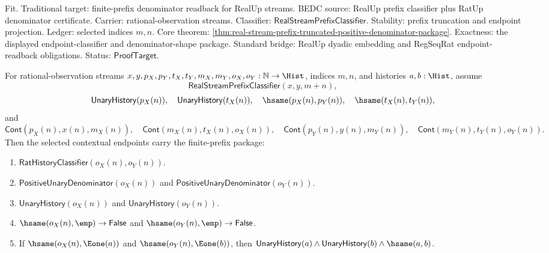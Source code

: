 Fit. Traditional target: finite-prefix denominator readback for RealUp streams.
BEDC source: RealUp prefix classifier plus RatUp denominator certificate.
Carrier: rational-observation streams. Classifier:
$\mathsf{RealStreamPrefixClassifier}$. Stability: prefix truncation and endpoint
projection. Ledger: selected indices $m,n$. Core theorem:
\autoref{thm:real-stream-prefix-truncated-positive-denominator-package}.
Exactness: the displayed endpoint-classifier and denominator-shape package.
Standard bridge: RealUp dyadic embedding and RegSeqRat endpoint-readback
obligations. Status: $\mathsf{ProofTarget}$.

\begin{theorem}
\label{thm:real-stream-prefix-contextual-e1-denominator-package}
For rational-observation streams
$x,y,p_X,p_Y,t_X,t_Y,m_X,m_Y,o_X,o_Y:\mathbb{N}\to\Hist$, indices $m,n$,
and histories $a,b:\Hist$, assume
$$
\mathsf{RealStreamPrefixClassifier}(x,y,m+n),
$$
$$
\mathsf{UnaryHistory}(p_X(n)),\quad
\mathsf{UnaryHistory}(t_X(n)),\quad
\hsame(p_X(n),p_Y(n)),\quad
\hsame(t_X(n),t_Y(n)),
$$
and
$$
\mathsf{Cont}(p_X(n),x(n),m_X(n)),\quad
\mathsf{Cont}(m_X(n),t_X(n),o_X(n)),
\quad
\mathsf{Cont}(p_Y(n),y(n),m_Y(n)),\quad
\mathsf{Cont}(m_Y(n),t_Y(n),o_Y(n)).
$$
Then the selected contextual endpoints carry the finite-prefix package:
\begin{enumerate}
\item $\mathsf{RatHistoryClassifier}(o_X(n),o_Y(n))$.
\item $\mathsf{PositiveUnaryDenominator}(o_X(n))$ and
$\mathsf{PositiveUnaryDenominator}(o_Y(n))$.
\item $\mathsf{UnaryHistory}(o_X(n))$ and $\mathsf{UnaryHistory}(o_Y(n))$.
\item $\hsame(o_X(n),\emp)\to\mathsf{False}$ and
$\hsame(o_Y(n),\emp)\to\mathsf{False}$.
\item If $\hsame(o_X(n),\Eone(a))$ and $\hsame(o_Y(n),\Eone(b))$, then
$\mathsf{UnaryHistory}(a)\land\mathsf{UnaryHistory}(b)\land\hsame(a,b)$.
\end{enumerate}
\end{theorem}
